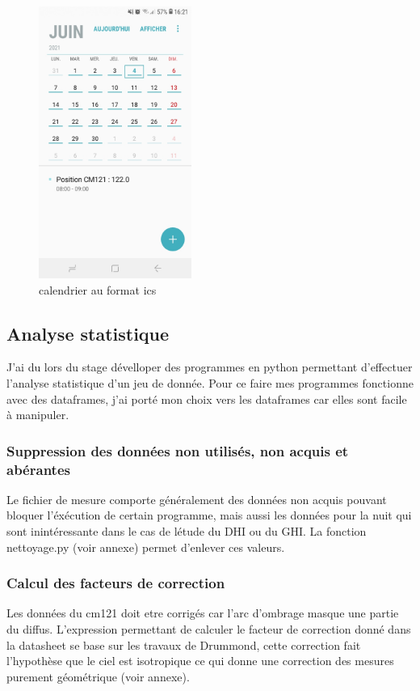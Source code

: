 \documentclass[12pt,a4paper]{article}
\begin{document}
\begin{flushleft}
\begin{figure}[H]
\centering
\includegraphics[width=5cm]{image/calendrier/4.jpg} 
\caption{calendrier au format ics}  
\end{figure}

\subsection{Analyse statistique}

J'ai du lors du stage dévelloper des programmes en python permettant d'effectuer l'analyse statistique d'un jeu de donnée. Pour ce faire mes programmes fonctionne avec des dataframes, j'ai porté mon choix vers les dataframes car elles sont facile à manipuler. 

\subsubsection{Suppression des données non utilisés, non acquis et abérantes}

Le fichier de mesure comporte généralement des données non acquis pouvant bloquer l'éxécution de certain programme, mais aussi les données pour la nuit qui sont inintéressante dans le cas de létude du DHI ou du GHI. La fonction nettoyage.py (voir annexe) permet d'enlever ces valeurs. 

\subsubsection{Calcul des facteurs de correction}

Les données du cm121 doit etre corrigés car l'arc d'ombrage masque une partie du diffus. L'expression permettant de calculer le facteur de correction donné dans la datasheet se base sur les travaux de Drummond, cette correction fait l'hypothèse que le ciel est isotropique ce qui donne une correction des mesures purement géométrique (voir annexe).\\


\end{flushleft}
\end{document}

